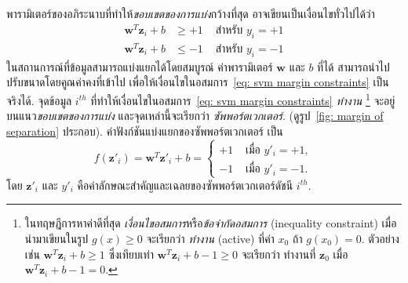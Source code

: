 พารามิเตอร์ของอภิระนาบที่ทำให้\textit{ขอบเขตของการแบ่ง}กว้างที่สุด
อาจเขียนเป็นเงื่อนไขทั่วไปได้ว่า
\begin{eqnarray}
\bm{w}^T \bm{z}_i + b & \geq +1 & \mbox{ สำหรับ } y_i = +1
\nonumber \\
\bm{w}^T \bm{z}_i + b & \leq -1 & \mbox{ สำหรับ } y_i = -1
\label{eq: svm margin constraints}
\end{eqnarray}
ในสถานการณ์ที่ข้อมูลสามารถแบ่งแยกได้โดยสมบูรณ์
ค่าพารามิเตอร์ $\bm{w}$ และ $b$ ที่ได้ สามารถนำไปปรับขนาดโดยคูณค่าคงที่เข้าไป 
เพื่อให้เงื่อนไขในอสมการ~\ref{eq: svm margin constraints} เป็นจริงได้.
จุดข้อมูล $i^{th}$ ที่ทำให้เงื่อนไขในอสมการ~\ref{eq: svm margin constraints} \textit{ทำงาน}%
\footnote{%
	ในทฤษฎีการหาค่าดีที่สุด \textit{เงื่อนไขอสมการ}หรือ\textit{ข้อจำกัดอสมการ} (inequality constraint) 
	เมื่อนำมาเขียนในรูป $g(x) \geq 0$ 
	จะเรียกว่า \textit{ทำงาน} (active) ที่ค่า $x_0$ ถ้า $g(x_0) = 0$.
	ตัวอย่างเช่น $\bm{w}^T \bm{z}_i + b \geq 1$ ซึ่งเทียบเท่า 
	$\bm{w}^T \bm{z}_i + b - 1 \geq 0$ จะเรียกว่า
	ทำงานที่ $\bm{z}_0$ เมื่อ $\bm{w}^T \bm{z}_i + b - 1 = 0$.
}
จะอยู่บนแนว\textit{ขอบเขตของการแบ่ง} และจุดเหล่านี้จะเรียกว่า \textit{ซัพพอร์ตเวกเตอร์}. (ดูรูป~\ref{fig: margin of separation} ประกอบ).
ค่าฟังก์ชันแบ่งแยกของซัพพอร์ตเวกเตอร์ เป็น
\[
f(\bm{z}'_i) = \bm{w}^T \bm{z}'_i + b = 
\left\{
\begin{array}{ll}
+1 & \mbox{ เมื่อ } y'_i = +1, \\
-1 & \mbox{ เมื่อ } y'_i = -1. 
\end{array}
\right.
\]
โดย $\bm{z}'_i$ และ $y'_i$ คือค่าลักษณะสำคัญและเฉลยของซัพพอร์ตเวกเตอร์ดัชนี $i^{th}$.

